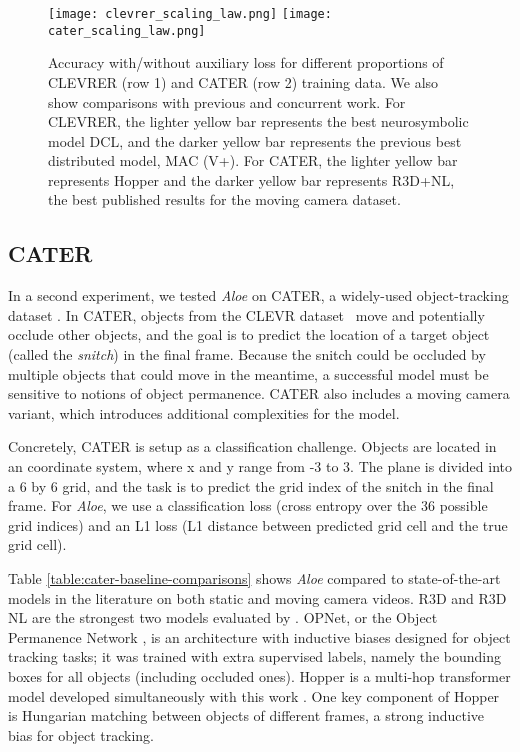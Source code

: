 \documentclass{article}
\newcommand{\Model}{\emph{Aloe}}
\begin{document}
\begin{figure*}[t]
    \centering
    \texttt{[image: clevrer\_scaling\_law.png]}
    \texttt{[image: cater\_scaling\_law.png]}
    \caption{Accuracy with/without auxiliary loss for different proportions of CLEVRER (row 1) and CATER (row 2) training data.
    We also show comparisons with previous and concurrent work.
    For CLEVRER, the lighter yellow bar represents the best neurosymbolic model DCL,
    and the darker yellow bar represents the previous best distributed model, MAC (V+).
    For CATER, the lighter yellow bar represents Hopper
    and the darker yellow bar represents R3D+NL,
    the best published results for the moving camera dataset.
    }
    \label{fig:lowdata}
\end{figure*}

\subsection{CATER}
In a second experiment, we tested \Model{} on CATER, a widely-used object-tracking dataset \citep{cater,shamsian2020learning,zhou2021hopper,goyal2021}.
In CATER, objects from the CLEVR dataset~\citep{Johnson2016clevr} move and potentially occlude other objects, and the goal is to predict the location of a target object (called the \emph{snitch})
in the final frame.
Because the snitch could be occluded by multiple objects that could move in the meantime,
a successful model must be sensitive to notions of object permanence.
CATER also includes a moving
camera variant,
which introduces additional complexities
for the model.

Concretely, CATER is setup as a classification challenge. Objects are located in an  coordinate system, where x and y range from -3 to 3. The  plane is divided into a 6 by 6 grid,
and the task is to predict the grid index of the snitch in the final frame. For \Model{}, we use a classification loss (cross entropy over the 36 possible grid indices) and an L1 loss (L1 distance between predicted grid cell and the true grid cell). 

Table \ref{table:cater-baseline-comparisons}
shows \Model{} compared to state-of-the-art models in  the literature
on both static and moving camera videos.
R3D and R3D  NL are the strongest two models evaluated by \citet{cater}.
OPNet, or the Object Permanence Network \citep{shamsian2020learning}, is an architecture with inductive biases designed for object tracking tasks;
it was trained with extra supervised labels, namely the bounding boxes for all objects (including occluded ones).
Hopper is a multi-hop transformer model developed simultaneously with this work \citep{zhou2021hopper}.
One key component of Hopper is Hungarian matching between objects of different frames,
a strong inductive bias for object tracking.
\end{document}
